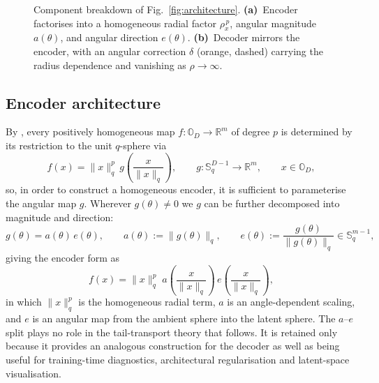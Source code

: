 \documentclass{article}
\theoremstyle{definition}
\begin{document}
\begin{figure}[t]
  \caption{Component breakdown of Fig.~\ref{fig:architecture}.
  \textbf{(a)}~Encoder factorises into a homogeneous radial factor
  $\rho_x^{\,p}$, angular magnitude $a(\theta)$, and angular direction
  $e(\theta)$. \textbf{(b)}~Decoder mirrors the encoder, with an
  angular correction $\delta$ (orange, dashed) carrying the radius
  dependence and vanishing as $\rho\to\infty$.}
  \label{fig:architecture-detail}
\end{figure}

\subsection{Encoder architecture}
\label{sec:encoder-architecture}

By , every positively homogeneous map \(f:\mathbb{O}_D\to\mathbb{R}^m\) of degree \(p\) is determined by its restriction to the unit \(q\)-sphere via
\[
f(x)=\|x\|_{q}^p\,g\!\left(\frac{x}{\|x\|_{q}}\right),
\qquad
g:\mathbb{S}^{D-1}_{q}\to\mathbb{R}^m,
\qquad x\in\mathbb{O}_D,
\]
so, in order to construct a homogeneous encoder, it is sufficient to parameterise the angular map \(g\). Wherever \(g(\theta)\neq 0\) we \(g\) can be further decomposed into magnitude and direction:
\[
g(\theta)=a(\theta)\,e(\theta),
\qquad
a(\theta):=\|g(\theta)\|_{q},
\qquad
e(\theta):=\frac{g(\theta)}{\|g(\theta)\|_{q}}\in\mathbb{S}^{m-1}_{q},
\]
giving the encoder form as
\[
f(x)
=
\|x\|_{q}^p\;
a\!\left(\frac{x}{\|x\|_{q}}\right)\,
e\!\left(\frac{x}{\|x\|_{q}}\right),
\]
in which \(\|x\|_{q}^p\) is the homogeneous radial term, \(a\) is an angle-dependent scaling, and \(e\) is an angular map from the ambient sphere into the latent sphere. The \(a\)--\(e\) split plays no role in the tail-transport theory that follows. It is retained only because it provides an analogous construction for the decoder as well as being useful for training-time diagnostics, architectural regularisation and latent-space visualisation.
\end{document}

